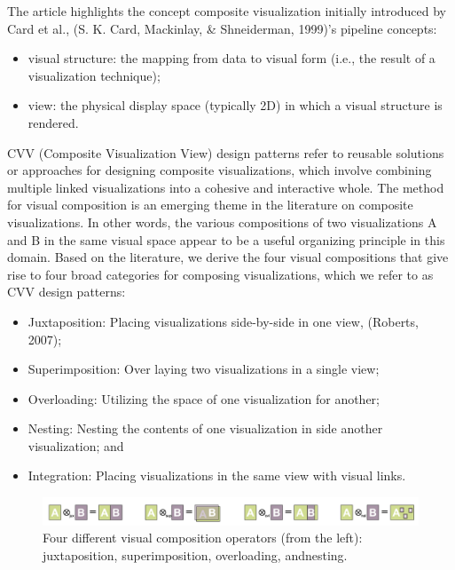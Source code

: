 \documentclass[print]{nuthesis}
\begin{document}
The article highlights the concept composite visualization initially introduced by Card et al., (S. K. Card, Mackinlay, \& Shneiderman, 1999)'s pipeline concepts:

\begin{itemize}
\item
  visual structure: the mapping from data to visual form (i.e., the result of a visualization technique);
\item
  view: the physical display space (typically 2D) in which a visual structure is rendered.
\end{itemize}

CVV (Composite Visualization View) design patterns refer to reusable solutions or approaches for designing composite visualizations, which involve combining multiple linked visualizations into a cohesive and interactive whole.
The method for visual composition is an emerging theme in the literature on composite visualizations.
In other words, the various compositions of two visualizations A and B in the same visual space appear to be a useful organizing principle in this domain.
Based on the literature, we derive the four visual compositions that give rise to four broad categories for composing visualizations, which we refer to as CVV design patterns:

\begin{itemize}
\item
  Juxtaposition: Placing visualizations side-by-side in one view, (Roberts, 2007);
\item
  Superimposition: Over laying two visualizations in a single view;
\item
  Overloading: Utilizing the space of one visualization for another;
\item
  Nesting: Nesting the contents of one visualization in side another visualization; and
\item
  Integration: Placing visualizations in the same view with visual links.
\end{itemize}

\begin{figure}

{\centering \includegraphics[width=0.75\linewidth]{figure/VisualComposition} 

}

\caption{Four different visual composition operators (from the left): juxtaposition, superimposition, overloading, andnesting.}\label{fig:VisualComposition}
\end{figure}
\end{document}
